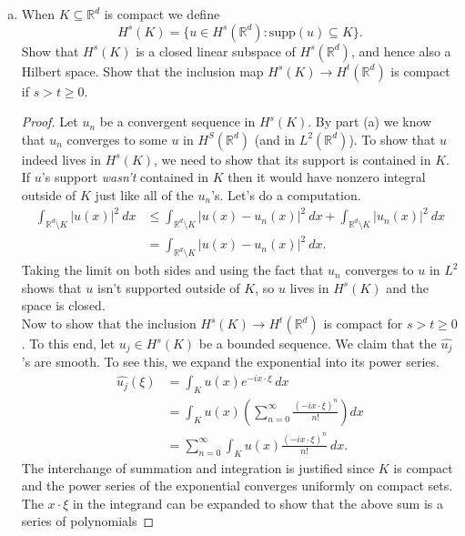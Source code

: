 \documentclass[11pt,letterpaper]{report}
\newcommand{\reals}{\mathbb{R}}
\newcommand{\mcal}[1]{\mathcal{#1}}
\newcommand{\supp}{\text{supp}}
\begin{document}
\begin{enumerate}[(a)]
\begin{proof}
		\noindent We claim that $u_n$ converges to $\mcal{F}^{-1}(v(\xi)\cdot \langle \xi\rangle^{-s})$ in $H^s(\reals^d)$. It was designed for this purpose after all.
		\begin{align*}
			\|u_n - \mcal{F}^{-1}(v(\xi)\cdot \langle \xi\rangle^{-s})\|_{H^s}^2 &= \frac{1}{(2\pi)^d}\int |\widehat{u_n}(\xi) - v(\xi)\cdot \langle \xi\rangle^{-s}|^2\cdot \langle \xi\rangle^{2s}\ d\xi\\
			&= \frac{1}{(2\pi)^d}\int|\widehat{u_n}(\xi)\cdot \langle \xi\rangle^s - v(\xi)|^2\ d\xi\\
			&\to 0.
		\end{align*}
		That $\mcal{F}^{-1}(v(\xi)\cdot \langle \xi\rangle^{-s})$ is in $H^s(\reals^d)$ follows immediately from $v$ being in $L^2(\reals^d)$. Thus, $H^s(\reals^d)$ is complete.
	\end{proof}

	\item When $K\subseteq \reals^d$ is compact we define
	\[
	H^s(K) = \{u\in H^s(\reals^d): \supp(u)\subseteq K\}.
	\]
	Show that $H^s(K)$ is a closed linear subspace of $H^s(\reals^d)$, and hence also a Hilbert space. Show that the inclusion map $H^s(K)\to H^t(\reals^d)$ is compact if $s>t\geq 0$.
	\begin{proof}
		Let $u_n$ be a convergent sequence in $H^s(K)$. By part (a) we know that $u_n$ converges to some $u$ in $H^S(\reals^d)$ (and in $L^2(\reals^d)$). To show that $u$ indeed lives in $H^s(K)$, we need to show that its support is contained in $K$. If $u$'s support \textit{wasn't} contained in $K$ then it would have nonzero integral outside of $K$ just like all of the $u_n$'s. Let's do a computation.
		\begin{align*}
			\int_{\reals^d\setminus K}|u(x)|^2\ dx &\leq \int_{\reals^d\setminus K}|u(x)-u_n(x)|^2\ dx + \int_{\reals^d\setminus K}|u_n(x)|^2\ dx\\
			&= \int_{\reals^d\setminus K}|u(x) - u_n(x)|^2\ dx.
		\end{align*}
		Taking the limit on both sides and using the fact that $u_n$ converges to $u$ in $L^2$ shows that $u$ isn't supported outside of $K$, so $u$ lives in $H^s(K)$ and the space is closed.\\

		Now to show that the inclusion $H^s(K)\to H^t(\reals^d)$ is compact for $s>t\geq 0$. To this end, let $u_j\in H^s(K)$ be a bounded sequence. We claim that the $\widehat{u_j}$'s are smooth. To see this, we expand the exponential into its power series.
		\begin{align*}
		\widehat{u_j}(\xi) &= \int_Ku(x)e^{-ix\cdot \xi}\ dx\\
		&= \int_Ku(x)\left(\sum_{n=0}^\infty \frac{(-ix\cdot \xi)^n}{n!}\right)dx\\
		&= \sum_{n=0}^\infty \int_Ku(x)\frac{(-ix\cdot \xi)^n}{n!}\ dx.
		\end{align*}
		The interchange of summation and integration is justified since $K$ is compact and the power series of the exponential converges uniformly on compact sets. The $x\cdot \xi$ in the integrand can be expanded to show that the above sum is a series of polynomials 
	\end{proof}
\end{enumerate}
\end{document}
